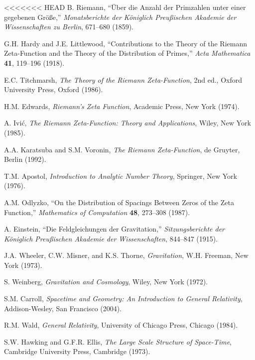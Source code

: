 \documentclass[12pt,a4paper]{article}
\begin{document}
\begin{thebibliography}{99}

<<<<<<< HEAD
 B. Riemann, ``Über die Anzahl der Primzahlen unter einer gegebenen Größe,'' \emph{Monatsberichte der Königlich Preußischen Akademie der Wissenschaften zu Berlin}, 671--680 (1859).

 G.H. Hardy and J.E. Littlewood, ``Contributions to the Theory of the Riemann Zeta-Function and the Theory of the Distribution of Primes,'' \emph{Acta Mathematica} \textbf{41}, 119--196 (1918).

 E.C. Titchmarsh, \emph{The Theory of the Riemann Zeta-Function}, 2nd ed., Oxford University Press, Oxford (1986).

 H.M. Edwards, \emph{Riemann's Zeta Function}, Academic Press, New York (1974).

 A. Ivić, \emph{The Riemann Zeta-Function: Theory and Applications}, Wiley, New York (1985).

 A.A. Karatsuba and S.M. Voronin, \emph{The Riemann Zeta-Function}, de Gruyter, Berlin (1992).

 T.M. Apostol, \emph{Introduction to Analytic Number Theory}, Springer, New York (1976).

 A.M. Odlyzko, ``On the Distribution of Spacings Between Zeros of the Zeta Function,'' \emph{Mathematics of Computation} \textbf{48}, 273--308 (1987).

 A. Einstein, ``Die Feldgleichungen der Gravitation,'' \emph{Sitzungsberichte der Königlich Preußischen Akademie der Wissenschaften}, 844--847 (1915).

 J.A. Wheeler, C.W. Misner, and K.S. Thorne, \emph{Gravitation}, W.H. Freeman, New York (1973).

 S. Weinberg, \emph{Gravitation and Cosmology}, Wiley, New York (1972).

 S.M. Carroll, \emph{Spacetime and Geometry: An Introduction to General Relativity}, Addison-Wesley, San Francisco (2004).

 R.M. Wald, \emph{General Relativity}, University of Chicago Press, Chicago (1984).

 S.W. Hawking and G.F.R. Ellis, \emph{The Large Scale Structure of Space-Time}, Cambridge University Press, Cambridge (1973).


\end{thebibliography}
\end{document}

